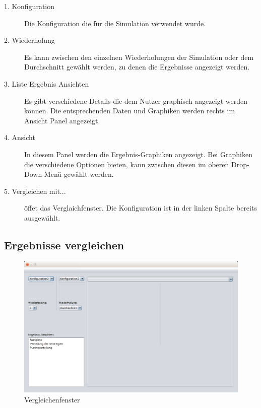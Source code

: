 \begin{description}

\item[1. Konfiguration] Die Konfiguration die für die Simulation verwendet wurde.

\item[2. Wiederholung] Es kann zwischen den einzelnen Wiederholungen der Simulation oder dem Durchschnitt gewählt werden, zu denen die Ergebnisse angezeigt werden.

\item[3. Liste Ergebnis Ansichten] Es gibt verschiedene Details die dem Nutzer graphisch angezeigt werden können. Die entsprechenden Daten und Graphiken werden rechts im Ansicht Panel angezeigt.

\item[4. Ansicht] In diesem Panel werden die Ergebnis-Graphiken angezeigt. Bei Graphiken die verschiedene Optionen bieten, kann zwischen diesen im oberen Drop-Down-Menü gewählt werden.

\item[5. Vergleichen mit...] öffet das Verglaichfenster. Die Konfiguration ist in der linken Spalte bereits ausgewählt.

\end{description}

\pagebreak


\subsection{Ergebnisse vergleichen}

\begin{figure}[!hp] 
  \centering
     \includegraphics[width=1.15\textwidth]{GUI_Entwurf/Vergleichfenster.png}
  \caption{Vergleichenfenster}
  \label{fig:Bild1}
\end{figure}


